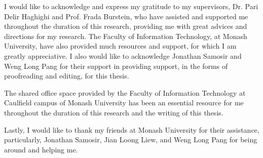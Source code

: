 
\begin{acknowledgements}      

I would like to acknowledge and express my gratitude to my supervisors, Dr. Pari Delir Haghighi and Prof. Frada Burstein, who have assisted and supported me throughout the duration of this research, providing me with great advices and directions for my research. The Faculty of Information Technology, at Monash University, have also provided much resources and support, for which I am greatly appreciative. I also would like to acknowledge Jonathan Samosir and Weng Long Pang for their support in providing support, in the forms of proofreading and editing, for this thesis.

The shared office space provided by the Faculty of Information Technology at Caulfield campus of Monash University has been an essential resource for me throughout the duration of this research and the writing of this thesis.

Lastly, I would like to thank my friends at Monash University for their assistance, particularly, Jonathan Samosir, Jian Loong Liew, and Weng Long Pang for being around and helping me.

\end{acknowledgements}
